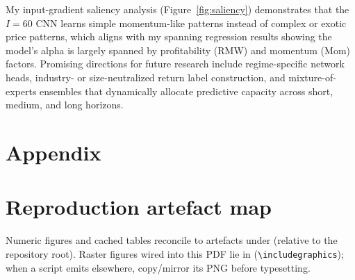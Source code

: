 \documentclass{article}
\begin{document}
My input-gradient saliency analysis (Figure~\ref{fig:saliency}) demonstrates that the $I=60$ CNN learns simple momentum-like patterns instead of complex or exotic price patterns, which aligns with my spanning regression results showing the model's alpha is largely spanned by profitability (RMW) and momentum (Mom) factors. Promising directions for future research include regime-specific network heads, industry- or size-neutralized return label construction, and mixture-of-experts ensembles that dynamically allocate predictive capacity across short, medium, and long horizons.





\appendix

\section*{Appendix}

\section{Reproduction artefact map}
\label{app:artefacts}

Numeric figures and cached tables reconcile to artefacts under%
%
(relative to the repository root). Raster figures wired into this PDF lie in%
%
(\texttt{\textbackslash includegraphics}); when a script emits elsewhere, copy/mirror its PNG before typesetting.\allowbreak{}
\end{document}
